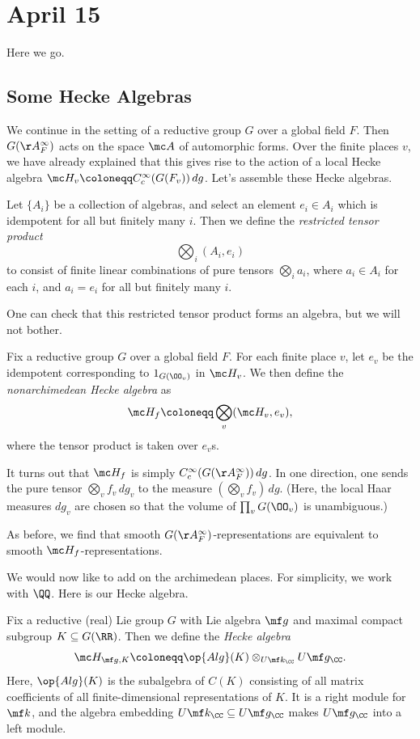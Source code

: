 \documentclass[../notes.tex]{subfiles}
\begin{document}
\section{April 15}
Here we go.

\subsection{Some Hecke Algebras}
We continue in the setting of a reductive group $G$ over a global field $F$. Then $G(\AA_F^\infty)$ acts on the space $\mc A$ of automorphic forms. Over the finite places $v$, we have already explained that this gives rise to the action of a local Hecke algebra $\mc H_v\coloneqq C_c^\infty(G(F_v))\,dg$. Let's assemble these Hecke algebras.
\begin{definition}
	Let $\{A_i\}$ be a collection of algebras, and select an element $e_i\in A_i$ which is idempotent for all but finitely many $i$. Then we define the \textit{restricted tensor product}
	\[\bigotimes_i(A_i,e_i)\]
	to consist of finite linear combinations of pure tensors $\bigotimes_ia_i$, where $a_i\in A_i$ for each $i$, and $a_i=e_i$ for all but finitely many $i$.
\end{definition}
One can check that this restricted tensor product forms an algebra, but we will not bother.
\begin{definition}
	Fix a reductive group $G$ over a global field $F$. For each finite place $v$, let $e_v$ be the idempotent corresponding to $1_{G(\OO_v)}$ in $\mc H_v$. We then define the \textit{nonarchimedean Hecke algebra} as
	\[\mc H_f\coloneqq\bigotimes_v(\mc H_v,e_v),\]
	where the tensor product is taken over $e_v$s.
\end{definition}
\begin{remark}
	It turns out that $\mc H_f$ is simply $C_c^\infty(G(\AA_F^\infty))\,dg$. In one direction, one sends the pure tensor $\bigotimes_vf_v\,dg_v$ to the measure $\left(\bigotimes_vf_v\right)\,dg$. (Here, the local Haar measures $dg_v$ are chosen so that the volume of $\prod_vG(\OO_v)$ is unambiguous.)
\end{remark}
\begin{remark}
	As before, we find that smooth $G(\AA_F^\infty)$-representations are equivalent to smooth $\mc H_f$-representations.
\end{remark}
We would now like to add on the archimedean places. For simplicity, we work with $\QQ$. Here is our Hecke algebra.
\begin{definition}
	Fix a reductive (real) Lie group $G$ with Lie algebra $\mf g$ and maximal compact subgroup $K\subseteq G(\RR)$. Then we define the \textit{Hecke algebra}
	\[\mc H_{\mf g,K}\coloneqq\op{Alg}(K)\otimes_{U\mf k_\CC}U\mf g_\CC.\]
	Here, $\op{Alg}(K)$ is the subalgebra of $C(K)$ consisting of all matrix coefficients of all finite-dimensional representations of $K$. It is a right module for $\mf k$, and the algebra embedding $U\mf k_\CC\subseteq U\mf g_\CC$ makes $U\mf g_\CC$ into a left module.
\end{definition}
\end{document}
